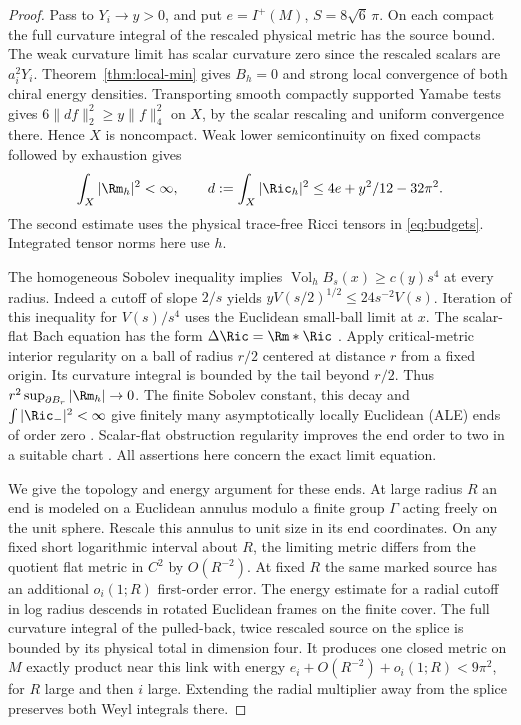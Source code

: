 \begin{proof}
Pass to \(Y_i\to y>0\), and put \(e=I^+(M)\), \(S=8\sqrt6\,\pi\).
On each compact the full curvature integral of the rescaled
physical metric has the source bound. The weak curvature limit
has scalar curvature zero since the rescaled scalars are \(a_i^2Y_i\).
Theorem~\ref{thm:local-min} gives \(B_h=0\) and strong local
convergence of both chiral energy densities.
Transporting smooth compactly supported Yamabe tests gives
\(6\|df\|_2^2\ge y\|f\|_4^2\) on \(X\), by the scalar rescaling
and uniform convergence there. Hence \(X\) is noncompact. Weak
lower semicontinuity on fixed compacts followed by exhaustion gives
\begin{equation}\label{eq:limit-ric-budget}
 \int_X|\Rm_h|^2<\infty,\qquad d:=\int_X|\Ric_h|^2
 \le 4e+y^2/12-32\pi^2 .
\end{equation}
The second estimate uses the physical trace-free Ricci tensors in
\eqref{eq:budgets}. Integrated tensor norms here use \(h\).

The homogeneous Sobolev inequality implies
\(\operatorname{Vol}_h B_s(x)\ge c(y)s^4\) at every radius.
Indeed a cutoff of slope \(2/s\) yields
\(yV(s/2)^{1/2}\le24s^{-2}V(s)\). Iteration of this inequality
for \(V(s)/s^4\) uses the Euclidean small-ball limit at \(x\).
The scalar-flat Bach equation has the form
\(\Delta\Ric=\Rm*\Ric\) \cite[\S2.1]{TianViaclovsky2004Moduli}.
Apply critical-metric interior regularity on a ball of radius
\(r/2\) centered at distance \(r\) from a fixed origin. Its
curvature integral is bounded by the tail beyond \(r/2\).
Thus \(r^2\sup_{\partial B_r}|\Rm_h|\to0\).
The finite Sobolev constant, this decay and
\(\int|\Ric_-|^2<\infty\) give finitely many asymptotically locally
Euclidean (ALE) ends of order zero
\cite[Theorems 1.2 and 1.1]{TianViaclovsky2008Volume}.
Scalar-flat obstruction regularity improves the end order to two
in a suitable chart \cite[Definition 1.1 and Theorem 1.2]{AcheViaclovsky2011Obstruction}.
All assertions here concern the exact limit equation.

We give the topology and energy argument for these ends. At large
radius \(R\) an end is modeled on a Euclidean annulus modulo a finite
group \(\Gamma\) acting freely on the unit sphere. Rescale this
annulus to unit size in its end coordinates. On any fixed short
logarithmic interval about \(R\), the limiting metric differs from
the quotient flat metric in \(C^2\) by \(O(R^{-2})\). At fixed \(R\)
the same marked source has an additional \(o_i(1;R)\) first-order
error. The energy estimate for a radial cutoff in log radius descends in rotated Euclidean frames
on the finite cover. The full curvature integral of the pulled-back, twice rescaled
source on the splice is bounded by its physical total in dimension four. It produces one closed metric on
\(M\) exactly product near this link with energy
\(e_i+O(R^{-2})+o_i(1;R)<9\pi^2\), for \(R\) large and then \(i\)
large. Extending the radial multiplier away from the splice preserves
both Weyl integrals there.


\end{proof}
